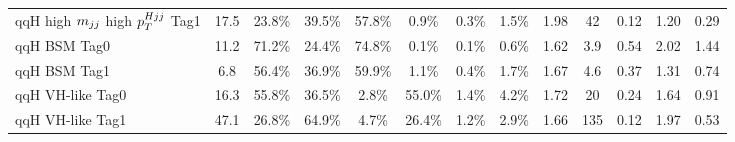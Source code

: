 \begin{tabular}{l|cccccccc|c|ccc}
     qqH high $m_{jj}$ high $p_T^{Hjj}$ Tag1 & 17.5 & 23.8\% & 39.5\% & 57.8\% & 0.9\% & 0.3\% & 1.5\% & 1.98 & 42 & 0.12 & 1.20 & 0.29 \\
     [\cmsTabSkip]
     qqH BSM Tag0 & 11.2 & 71.2\% & 24.4\% & 74.8\% & 0.1\% & 0.1\% & 0.6\% & 1.62 & 3.9 & 0.54 & 2.02 & 1.44 \\
     qqH BSM Tag1 & 6.8 & 56.4\% & 36.9\% & 59.9\% & 1.1\% & 0.4\% & 1.7\% & 1.67 & 4.6 & 0.37 & 1.31 & 0.74 \\
     [\cmsTabSkip]
     qqH VH-like Tag0 & 16.3 & 55.8\% & 36.5\% & 2.8\% & 55.0\% & 1.4\% & 4.2\% & 1.72 & 20 & 0.24 & 1.64 & 0.91 \\
     qqH VH-like Tag1 & 47.1 & 26.8\% & 64.9\% & 4.7\% & 26.4\% & 1.2\% & 2.9\% & 1.66 & 135 & 0.12 & 1.97 & 0.53 \\
     [\cmsTabSkip]
\end{tabular}
